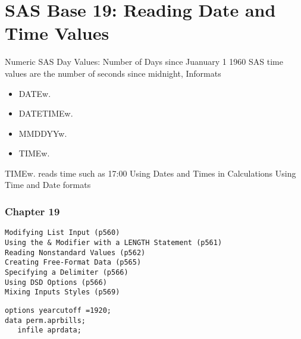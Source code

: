 \section{SAS Base 19: Reading Date and Time Values}

Numeric SAS Day Values: Number of Days since  Juanuary 1 1960
SAS time values are the number of seconds since midnight,
Informats
\begin{itemize}
\item DATEw.
\item DATETIMEw.
\item MMDDYYw.
\item TIMEw.
\end{itemize}
TIMEw. reads time such as 17:00
Using Dates and Times in Calculations
Using Time and Date formats

\subsubsection{Chapter 19}
\begin{verbatim}
Modifying List Input (p560)
Using the & Modifier with a LENGTH Statement (p561)
Reading Nonstandard Values (p562)
Creating Free-Format Data (p565)
Specifying a Delimiter (p566)
Using DSD Options (p566)
Mixing Inputs Styles (p569)
\end{verbatim}
\begin{framed}
\begin{verbatim}
options yearcutoff =1920;
data perm.aprbills;
   infile aprdata;
\end{verbatim}
\end{framed}
